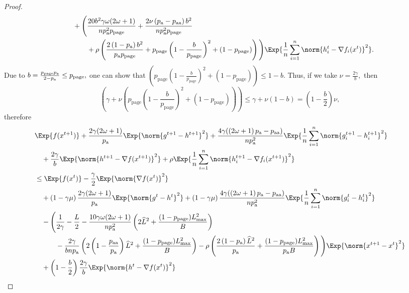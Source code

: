 \documentclass{article}
\newcommand*{\probavailable}{\ensuremath{p_{\textnormal{a}}}}
\newcommand*{\probpairaa}{\ensuremath{p_{\textnormal{aa}}}}
\newcommand*{\probpage}{\ensuremath{p_{\text{page}}}}
\begin{document}
\begin{proof}
\begin{align*}
      &\quad + \Bigg(\frac{20 b^2 \gamma \omega (2 \omega + 1)}{n \probavailable^2 \probpage} + \frac{2 \nu \left(\probavailable - \probpairaa\right) b^2}{n \probavailable^2 \probpage} \\
      &\qquad\quad+ \rho \left(\frac{2\left(1 - \probavailable\right)b^2}{\probavailable \probpage} + \probpage\left(1 - \frac{b}{\probpage}\right)^2 + (1 - \probpage)\right)\Bigg)\Exp{\frac{1}{n}\sum_{i=1}^n\norm{h^{t}_i - \nabla f_i(x^{t})}^2}.
    \end{align*}
    Due to $b = \frac{\probpage \probavailable}{2 - \probavailable} \leq \probpage,$ one can show that $\left(\probpage\left(1 - \frac{b}{\probpage}\right)^2 + (1 - \probpage)\right) \leq 1 - b.$ 
    Thus, if we take $\nu = \frac{2\gamma}{b},$ then
    $$\left(\gamma + \nu \left(\probpage\left(1 - \frac{b}{\probpage}\right)^2 + (1 - \probpage)\right)\right) \leq \gamma + \nu (1 - b) = \left(1 - \frac{b}{2}\right)\nu,$$ therefore
    \begin{align*}
      &\Exp{f(x^{t + 1})} + \frac{2\gamma (2\omega + 1)}{\probavailable} \Exp{\norm{g^{t+1} - h^{t+1}}^2} + \frac{4 \gamma (\left(2 \omega + 1\right)\probavailable - \probpairaa)}{n \probavailable^2} \Exp{\frac{1}{n}\sum_{i=1}^n\norm{g^{t+1}_i - h^{t+1}_i}^2}\\
      &\quad  + \frac{2\gamma}{b} \Exp{\norm{h^{t+1} - \nabla f(x^{t+1})}^2} + \rho \Exp{\frac{1}{n}\sum_{i=1}^n\norm{h^{t+1}_i - \nabla f_i(x^{t+1})}^2}\\
      &\leq \Exp{f(x^t)} - \frac{\gamma}{2}\Exp{\norm{\nabla f(x^t)}^2} \\
      &\quad + \left(1 - \gamma \mu\right)\frac{2\gamma(2\omega + 1)}{\probavailable}\Exp{\norm{g^{t} - h^t}^2} + \left(1 - \gamma \mu\right)\frac{4 \gamma (\left(2 \omega + 1\right)\probavailable - \probpairaa)}{n \probavailable^2}\Exp{\frac{1}{n} \sum_{i=1}^n\norm{g^t_i - h^{t}_i}^2}\\
      &\quad - \Bigg(\frac{1}{2\gamma} - \frac{L}{2} - \frac{10 \gamma \omega (2 \omega + 1)}{n \probavailable^2} \left(2 \widehat{L}^2 + \frac{(1 - \probpage)L_{\max}^2}{B}\right) \\
      &\qquad\quad - \frac{2\gamma}{b n \probavailable}\left(2 \left(1 - \frac{\probpairaa}{\probavailable}\right) \widehat{L}^2 + \frac{(1 - \probpage)L_{\max}^2}{B}\right) - \rho \left(\frac{2\left(1 - \probavailable\right)\widehat{L}^2}{\probavailable} + \frac{(1 - \probpage)L_{\max}^2}{\probavailable B}\right)\Bigg) \Exp{\norm{x^{t+1} - x^t}^2} \\
      &\quad + \left(1 - \frac{b}{2}\right)\frac{2\gamma}{b} \Exp{\norm{h^{t} - \nabla f(x^{t})}^2} \\

\end{align*}
\end{proof}
\end{document}
